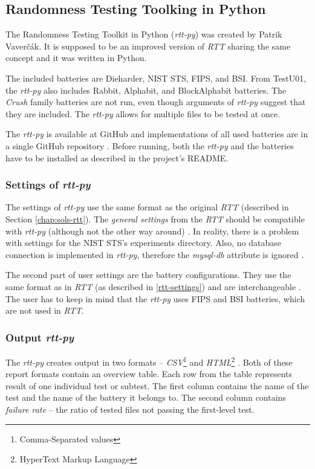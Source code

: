 \documentclass[
  digital,     %
  oneside,     %
  nosansbold,  %
  nocolorbold, %
  nolof,         %
  nolot,         %
]{fithesis4}
\begin{document}
\subsection{Randomness Testing Toolking in Python} \label{chap:sols-rtt-py}
The Randomness Testing Toolkit in Python (\emph{rtt-py}) was created by Patrik Vaverčák. It is supposed to be an improved version of \emph{RTT} sharing the same concept \cite[p.~24]{vavercak} and it was written in Python.

The included batteries are Dieharder, NIST STS, FIPS, and BSI. From TestU01, the \emph{rtt-py} also includes Rabbit, Alphabit, and BlockAlphabit batteries. The \emph{Crush} family batteries are not run, even though arguments of \emph{rtt-py} suggest that they are included. The \emph{rtt-py} allows for multiple files to be tested at once.

The \emph{rtt-py} is available at GitHub \cite{rtt-py-site} and implementations of all used batteries are in a single GitHub repository \cite{rtt-py-batteries}. Before running, both the \emph{rtt-py} and the batteries have to be installed as described in the project's README.

\subsubsection{Settings of \emph{rtt-py}}
The settings of \emph{rtt-py} use the same format as the original \emph{RTT} (described in Section \ref{chap:sols-rtt}). The \emph{general settings} from the \emph{RTT} should be compatible with \emph{rtt-py} (although not the other way around) \cite[p. 25]{vavercak}. In reality, there is a problem with settings for the NIST STS's experiments directory. Also, no database connection is implemented in \emph{rtt-py}, therefore the \emph{mysql-db} attribute is ignored \cite{rtt-py-site}.

The second part of user settings are the battery configurations. They use the same format as in \emph{RTT} (as described in \ref{rtt-settings}) and are interchangeable \cite[p.~25]{vavercak}. The user has to keep in mind that the \emph{rtt-py} uses FIPS and BSI batteries, which are not used in \emph{RTT}. 

\subsubsection{Output \emph{rtt-py}}
The \emph{rtt-py} creates output in two formats -- \emph{CSV}\footnote{Comma-Separated values} and \emph{HTML}\footnote{HyperText Markup Language} \cite[p.~36]{vavercak}. Both of these report formats contain an overview table. Each row from the table represents result of one individual test or subtest. The first column contains the name of the test and the name of the battery it belongs to. The second column contains \emph{failure rate} -- the ratio of tested files not passing the first-level test.
\end{document}
